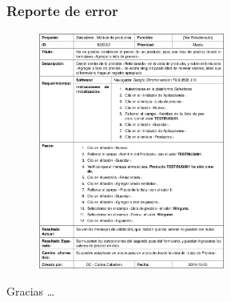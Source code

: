 \documentclass{beamer}
\begin{document}
\begin{frame}
\frametitle{Reporte de error}
\begin{figure}
\centering
\includegraphics[width=0.55\textwidth]{graphics/figure5.eps}
\end{figure}
\end{frame}

\begin{frame}
Gracias \ldots
\end{frame}
\end{document}
